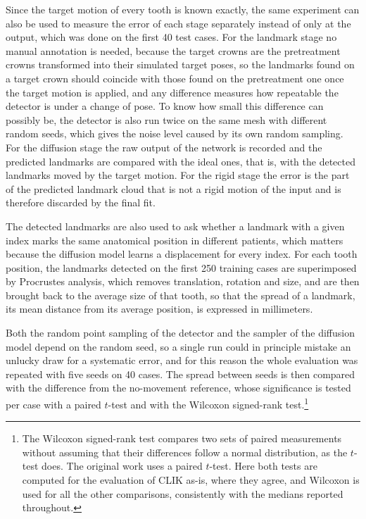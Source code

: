 \documentclass[10pt,a4paper]{article}
\begin{document}
Since the target motion of every tooth is known exactly, the same experiment can also be used to measure the error of each stage separately instead of only at the output, which was done on the first 40 test cases. For the landmark stage no manual annotation is needed, because the target crowns are the pretreatment crowns transformed into their simulated target poses, so the landmarks found on a target crown should coincide with those found on the pretreatment one once the target motion is applied, and any difference measures how repeatable the detector is under a change of pose. To know how small this difference can possibly be, the detector is also run twice on the same mesh with different random seeds, which gives the noise level caused by its own random sampling. For the diffusion stage the raw output of the network is recorded and the predicted landmarks are compared with the ideal ones, that is, with the detected landmarks moved by the target motion. For the rigid stage the error is the part of the predicted landmark cloud that is not a rigid motion of the input and is therefore discarded by the final fit.

The detected landmarks are also used to ask whether a landmark with a given index marks the same anatomical position in different patients, which matters because the diffusion model learns a displacement for every index. For each tooth position, the landmarks detected on the first 250 training cases are superimposed by Procrustes analysis, which removes translation, rotation and size, and are then brought back to the average size of that tooth, so that the spread of a landmark, its mean distance from its average position, is expressed in millimeters.

Both the random point sampling of the detector and the sampler of the diffusion model depend on the random seed, so a single run could in principle mistake an unlucky draw for a systematic error, and for this reason the whole evaluation was repeated with five seeds on 40 cases. The spread between seeds is then compared with the difference from the no-movement reference, whose significance is tested per case with a paired $t$-test and with the Wilcoxon signed-rank test.\footnote{The Wilcoxon signed-rank test compares two sets of paired measurements without assuming that their differences follow a normal distribution, as the $t$-test does. The original work uses a paired $t$-test. Here both tests are computed for the evaluation of CLIK as-is, where they agree, and Wilcoxon is used for all the other comparisons, consistently with the medians reported throughout.}
\end{document}
